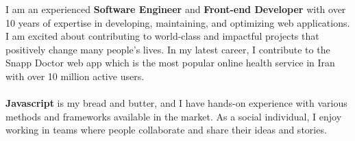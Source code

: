 \documentclass[8pt]{developercv} %
\begin{document}
    \begin{minipage}[t]{0.5\textwidth}
        \vspace{-6pt}

        I am an experienced \textbf{Software Engineer} and \textbf{Front-end Developer} with over 10 years of expertise in developing, maintaining, and optimizing web applications.
        I am excited about contributing to world-class and impactful projects that positively change many people's lives.
        In my latest career, I contribute to the Snapp Doctor web app which is the most popular online health service in Iran with over 10 million active users.
        \\
        \\
        \textbf{Javascript} is my bread and butter, and I have hands-on experience with various methods and frameworks available in the market.
        As a social individual, I enjoy working in teams where people collaborate and share their ideas and stories.

    \end{minipage}
    \hfill %
\end{document}
